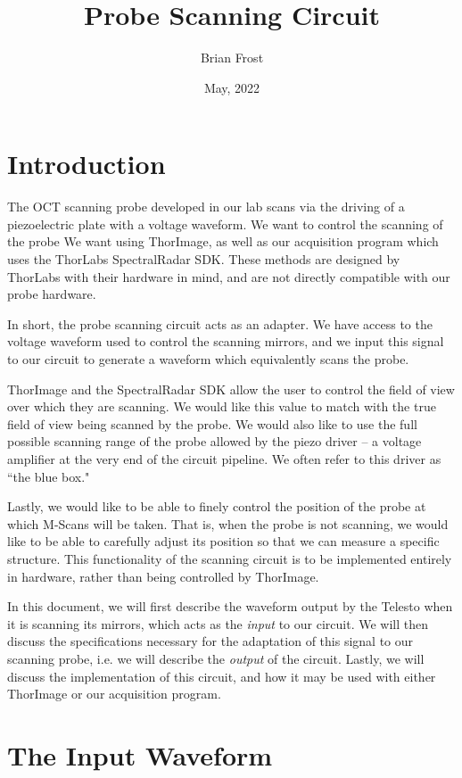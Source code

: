 \documentclass{article}
\title{Probe Scanning Circuit}
\date{May, 2022}
\author{Brian Frost}
\begin{document}
\maketitle

\section{Introduction}

\par{The OCT scanning probe developed in our lab scans via the driving of a piezoelectric plate with a voltage waveform. We want to control the scanning of the probe We want using ThorImage, as well as our acquisition program which uses the ThorLabs SpectralRadar SDK. These methods are designed by ThorLabs with their hardware in mind, and are not directly compatible with our probe hardware.}
\par{In short, the probe scanning circuit acts as an adapter. We have access to the voltage waveform used to control the scanning mirrors, and we input this signal to our circuit to generate a waveform which equivalently scans the probe.}
\par{ThorImage and the SpectralRadar SDK allow the user to control the field of view over which they are scanning. We would like this value to match with the true field of view being scanned by the probe. We would also like to use the full possible scanning range of the probe allowed by the piezo driver -- a voltage amplifier at the very end of the circuit pipeline. We often refer to this driver as ``the blue box."}
\par{Lastly, we would like to be able to finely control the position of the probe at which M-Scans will be taken. That is, when the probe is not scanning, we would like to be able to carefully adjust its position so that we can measure a specific structure. This functionality of the scanning circuit is to be implemented entirely in hardware, rather than being controlled by ThorImage.}
\par{In this document, we will first describe the waveform output by the Telesto when it is scanning its mirrors, which acts as the \textit{input} to our circuit. We will then discuss the specifications necessary for the adaptation of this signal to our scanning probe, i.e. we will describe the \textit{output} of the circuit. Lastly, we will discuss the implementation of this circuit, and how it may be used with either ThorImage or our acquisition program.}

\section{The Input Waveform}
\end{document}
